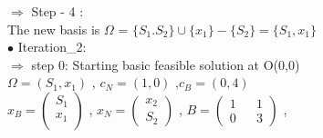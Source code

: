 \documentclass{beamer}
\begin{document}
\begin{frame}
  $\Rightarrow$ Step - 4 : \\ 
\vspace{0.4cm} 
The new basis is $\Omega$ = $\{S_{1}.S_{2}\} \cup \{x_1\} - \{S_2\} = \{S_1,x_1\} $ \\
\vspace{1cm}
$\bullet$ Iteration_2:\\
$\Rightarrow$ step 0: Starting basic feasible solution at O(0,0)\\
\vspace{0.5cm}
\hspace{2cm}
$\Omega=(S_{1},x_{1})$ , $c_N = (1,0)$ ,$c_B = (0,4) $                      \\
\vspace{0.5cm}
\hspace{2cm}
   $ x_B=\begin{pmatrix}
S_{1}\\
x_{1}  \\
\end{pmatrix} $
    ,
  $x_N=\begin{pmatrix}
x_{2}\\
S_{2}  
\end{pmatrix}$ ,
\vspace{0.5cm}
\hspace{0.3cm}
 $B =\begin{pmatrix}
1 && 1   \\
0 && 3  
\end{pmatrix}$ ,
\end{frame}
\end{document}
